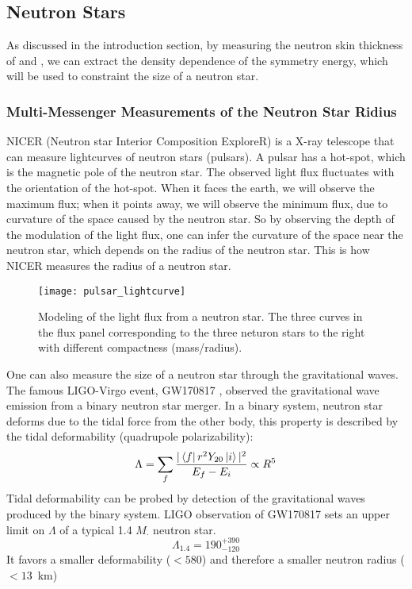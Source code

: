 \subsection{Neutron Stars}
As discussed in the introduction section, by measuring the neutron skin thickness of \Pb and
\Ca, we can extract the density dependence of the symmetry energy,
which will be used to constraint the size of a neutron star.

\subsubsection{Multi-Messenger Measurements of the Neutron Star Ridius}
NICER (Neutron star Interior Composition ExploreR) \cite{NICER} is a X-ray telescope that
can measure lightcurves of neutron stars (pulsars). A pulsar has a hot-spot, which
is the magnetic pole of the neutron star. The observed light flux fluctuates 
with the orientation of the hot-spot. When it faces the earth, we will observe the 
maximum flux; when it points away, we will observe the minimum flux, due to 
curvature of the space caused by the neutron star. So by observing 
the depth of the modulation of the light flux, one can infer the curvature of the 
space near the neutron star, which depends on the radius of the neutron star. 
This is how NICER measures the radius of a neutron star.
\begin{figure}[!h]
    \centering
    \texttt{[image: pulsar\_lightcurve]}
    \caption[Light flux curve]{Modeling of the light flux from a neutron star. The three curves
    in the flux panel corresponding to the three neturon stars to the right
    with different compactness (mass/radius).
    }
\end{figure}

One can also measure the size of a neutron star through the gravitational waves.
The famous LIGO-Virgo event, GW170817 \cite{PhysRevLett.119.161101}, 
observed the gravitational wave emission from a binary neutron star merger. 
In a binary system, neutron star deforms
due to the tidal force from the other body, this property is described by the
tidal deformability (quadrupole polarizability):
\begin{equation}
    \Lambda = \sum_f \frac{|\bra{f}r^2Y_{20}\ket{i}|^2}{E_f - E_i} \propto R^5 
\end{equation}
Tidal deformability can be probed by detection of the gravitational waves produced
by the binary system.
LIGO observation of GW170817 sets an upper limit on $\Lambda$ of a typical 1.4 $M_\cdot$
neutron star\cite{PhysRevLett.121.161101}. 
\begin{equation}
    \Lambda_{1.4} = 190^{+390}_{-120}
\end{equation}
It favors a smaller deformability ($<580$) and therefore a smaller neutron radius ($<13$~km)

